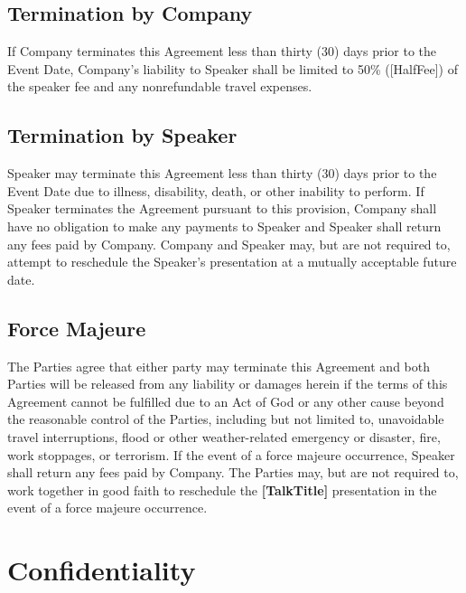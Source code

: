 \documentclass[a4paper,12pt]{article} %
\newcommand{\HalfFee}{[HalfFee]}
\newcommand{\TalkTitle}{[TalkTitle]}
\begin{document}
\subsection{Termination by Company}

If Company terminates this Agreement less than thirty (30) days prior to the Event Date, Company's liability to Speaker shall be limited to 50\% (\HalfFee) of the speaker fee and any nonrefundable travel expenses.

\subsection{Termination by Speaker}

Speaker may terminate this Agreement less than thirty (30) days prior to the Event Date due to illness, disability, death, or other inability to perform. If Speaker terminates the Agreement pursuant to this provision, Company shall have no obligation to make any payments to Speaker and Speaker shall return any fees paid by Company. Company and Speaker may, but are not required to, attempt to reschedule the Speaker's presentation at a mutually acceptable future date.

\subsection{Force Majeure}

The Parties agree that either party may terminate this Agreement and both Parties will be released from any liability or damages herein if the terms of this Agreement cannot be fulfilled due to an Act of God or any other cause beyond the reasonable control of the Parties, including but not limited to, unavoidable travel interruptions, flood or other weather-related emergency or disaster, fire, work stoppages, or terrorism. If the event of a force majeure occurrence, Speaker shall return any fees paid by Company. The Parties may, but are not required to, work together in good faith to reschedule the \textbf{\TalkTitle} presentation in the event of a force majeure occurrence.



\section{Confidentiality}
\end{document}
